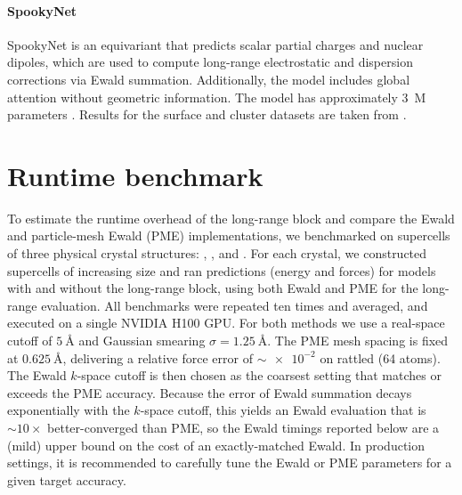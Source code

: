 \documentclass[10pt]{article}
\newcommand{\rev}[1]{\textcolor{periwinkle}{#1}}
\begin{document}
\paragraph{SpookyNet}
SpookyNet \citep{ucgssm2021} is an equivariant \mlp that predicts scalar partial charges and nuclear dipoles, which are used to compute long-range electrostatic and dispersion corrections via Ewald summation. Additionally, the model includes global attention without geometric information. The model has approximately \qty{3}{M} parameters \citep{bmc2023}. Results for the  surface and  cluster datasets are taken from \citet{kfgb2021}.

\clearpage
\section{Runtime benchmark}
\label{sec:apx-benchmark}

To estimate the runtime overhead of the long-range block and compare the Ewald and particle-mesh Ewald (PME) implementations, we benchmarked \lorem on supercells of three physical crystal structures: , , and . For each crystal, we constructed supercells of increasing size and ran predictions (energy and forces) for \lorem models with and without the long-range block, using both Ewald and PME for the long-range evaluation. All benchmarks were repeated ten times and averaged, and executed on a single NVIDIA H100 GPU. \rev{For both methods we use a real-space cutoff of $\qty{5}{\angstrom}$ and Gaussian smearing $\sigma=\qty{1.25}{\angstrom}$. The PME mesh spacing is fixed at $\qty{0.625}{\angstrom}$, delivering a relative force error of $\sim\!\num{e-2}$ on rattled \ch{NaCl} (64 atoms). The Ewald \mbox{$k$-space} cutoff is then chosen as the coarsest setting that matches or exceeds the PME accuracy. Because the error of Ewald summation decays exponentially with the $k$-space cutoff, this yields an Ewald evaluation that is $\sim\!10\times$ better-converged than PME, so the Ewald timings reported below are a (mild) upper bound on the cost of an exactly-matched Ewald. In production settings, it is recommended to carefully tune the Ewald or PME parameters for a given target accuracy.}
\end{document}
